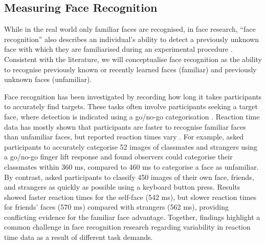 \documentclass[
  authoryear,
  review,
  3p,
  onecolumn]{elsarticle}
\begin{document}
\subsection{Measuring Face
Recognition}\label{measuring-face-recognition}

While in the real world only familiar faces are recognised, in face
research, ``face recognition'' also describes an individual's ability to
detect a previously unknown face with which they are familiarised during
an experimental procedure
\citep{burton2013a, hancock2000a, white_individual_2022}. Consistent
with the literature, we will conceptualise face recognition as the
ability to recognise previously known or recently learned faces
(familiar) and previously unknown faces (unfamiliar).

Face recognition has been investigated by recording how long it takes
participants to accurately find targets. These tasks often involve
participants seeking a target face, where detection is indicated using a
go/no-go categorisation \citep{kloth2006a, ramon2011a, tong1999a}.
Reaction time data has mostly shown that participants are faster to
recognise familiar faces than unfamiliar faces, but reported reaction
times vary \citep{burton2015a, ramon2011a, ramon2017a}. For example,
\citet{ramon2011a} asked participants to accurately categorise 52 images
of classmates and strangers using a go/no-go finger lift response and
found observers could categorise their classmates within 360 ms,
compared to 460 ms to categorise a face as unfamiliar. By contrast,
\citet{alzueta2019a} asked participants to classify 450 images of their
own face, friends, and strangers as quickly as possible using a keyboard
button press. Results showed faster reaction times for the self-face
(542 ms), but slower reaction times for friends' faces (570 ms) compared
with strangers (562 ms), providing conflicting evidence for the familiar
face advantage. Together, findings highlight a common challenge in face
recognition research regarding variability in reaction time data as a
result of different task demands.
\end{document}
